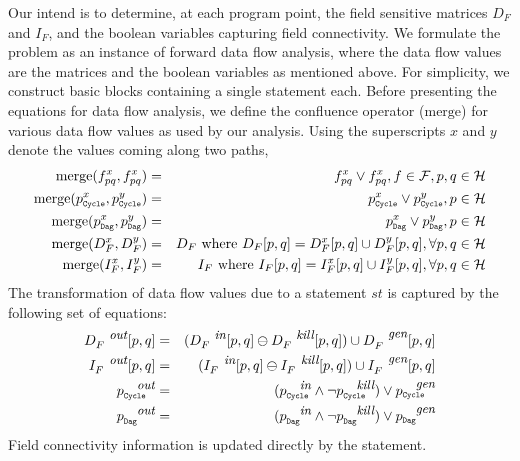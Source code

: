 \documentclass[runningheads,a4paper]{llncs}
\newcommand{\p}{\ensuremath{p}}
\newcommand{\q}{\ensuremath{q}}
\newcommand{\heap}{\ensuremath{\mathcal{H}}}
\newcommand{\fields}{\ensuremath{\mathcal{F}}}
\newcommand{\subC}{\mbox{\scalebox{.6}{\Cycle}}}
\newcommand{\subD}{\mbox{\scalebox{.6}{\Dag}}}
\newcommand{\dout}{\mbox{\footnotesize\em out}}
\newcommand{\din}{\mbox{\footnotesize\em in}}
\newcommand{\dkill}{\mbox{\footnotesize\em kill}}
\newcommand{\dgen}{\mbox{\footnotesize\em gen}}
\newcommand{\merge}{\ensuremath{\mathrm{merge}}}
\newcommand{\remOne}[2]{\ensuremath{#1 \ominus #2}}
\newcommand{\Dag}{{\tt Dag}}
\newcommand{\Cycle}{{\tt Cycle}}
\newcommand{\sub}[2]{\ensuremath{{#1}_{#2}}}
\begin{document}
{\red Our intend is to determine, at each program point, the
  field sensitive matrices $\sub{D}{F}$ and $\sub{I}{F}$, and
  the boolean variables capturing field connectivity. We
  formulate the problem as an instance of forward data flow
  analysis, where the data flow values are the matrices and
  the boolean variables as mentioned above.  For simplicity,
  we construct basic blocks containing a single statement
  each. Before presenting the equations for data flow
  analysis, we define the confluence operator (\merge) for various
  data flow values as used by our analysis. Using the
  superscripts $x$ and $y$ denote the values  coming along
  two paths,
\begin{eqnarray*}
  \merge( f_{\p\q}^x, f_{\p\q}^x ) &=& f_{\p\q}^x \vee f_{\p\q}^x , f \in \fields,
  \p,\q \in \heap \\
   \merge(\p_{\subC}^x, \p_{\subC}^y) &=& \p_{\subC}^x \vee
   \p_{\subC}^y, \p \in \heap \\
   \merge(\p_{\subD}^x, \p_{\subD}^y) &=& \p_{\subD}^x \vee
   \p_{\subD}^y, \p \in \heap \\
   \merge(\sub{D}{F}^{x}, \sub{D}{F}^{y}) &=& D_F \mbox{ where }
   D_F[{\p}, {\q}]  = \sub{D}{F}^{x}[{\p}, {\q}] \cup
   \sub{D}{F}^{y}[{\p}, {\q}],   \forall {\p}, {\q} \in \heap\\ 
   \merge(\sub{I}{F}^{x}, \sub{I}{F}^{y}) &=& I_F \mbox{ where }
   I_F[{\p}, {\q}]  = \sub{I}{F}^{x}[{\p}, {\q}] \cup
   \sub{I}{F}^{y}[{\p}, {\q}],   \forall {\p}, {\q} \in \heap \\ 
\end{eqnarray*}
The transformation of data flow values due to a statement
$st$ is captured by the following set of equations:
\begin{eqnarray*}
  D_F^{\dout}[\p,\q] &=& (\remOne{D_F^{\din}[\p,\q]}{D_F^{\dkill}[\p,\q]}) \cup
  D_F^{\dgen}[\p,\q] \\
  I_F^{\dout}[\p,\q] &=& (\remOne{I_F^{\din}[\p,\q]}{I_F^{\dkill}[\p,\q]}) \cup
  I_F^{\dgen}[\p,\q] \\
  \p_{\subC}^{\dout} &=& (\p_{\subC}^{\din} \wedge
  \neg\p_{\subC}^{\dkill} ) \vee \p_{\subC}^{\dgen}  \\
  \p_{\subD}^{\dout} &=& (\p_{\subD}^{\din} \wedge
  \neg\p_{\subD}^{\dkill} ) \vee \p_{\subD}^{\dgen} 
\end{eqnarray*}
Field connectivity information is updated directly by the
statement. 
}
\end{document}
